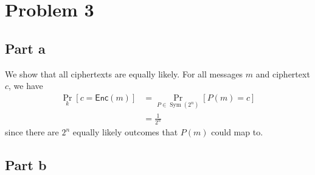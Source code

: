 \documentclass{article}
\theoremstyle{definition}
\DeclareMathOperator{\Sym}{Sym}
\begin{document}
\section*{Problem 3}

\subsection*{Part a}

We show that all ciphertexts are equally likely.
For all messages $m$ and ciphertext $c$, we have
\begin{align*}
    \Pr_{k}[c=\mathsf{Enc}(m)]&=\Pr_{P\in\Sym(2^n)}[P(m)=c]\\
    &=\frac{1}{2^n}
\end{align*}
since there are $2^n$ equally likely outcomes that $P(m)$ could map to.

\subsection*{Part b}
\end{document}
